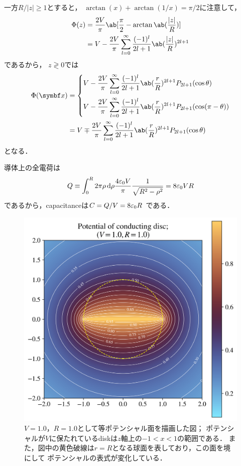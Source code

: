   一方$R / |z| \geq 1$とすると，
  $\arctan(x) + \arctan(1/x) = \pi/2$に注意して，
  \begin{align}%
    \Phi(z) &= \frac{2V}{\pi}\ab[\frac{\pi}{2}-\arctan\ab(\frac{|z|}{R})]\notag\\
    &= V - \frac{2V}{\pi} \sum_{l=0}^\infty \frac{(-1)^l}{2l+1}\ab(\frac{|z|}{R})^{2l+1}
  \end{align}%
  であるから，
  $z \gtrless 0$では
  \begin{align}%
    \Phi(\bs{x}) &=
    \begin{dcases}
      V - \frac{2V}{\pi} \sum_{l=0}^\infty \frac{(-1)^l}{2l+1} \ab(\frac rR)^{2l+1} P_{2l+1}(\cos\theta)\\
      V - \frac{2V}{\pi} \sum_{l=0}^\infty \frac{(-1)^l}{2l+1} \ab(\frac rR)^{2l+1} P_{2l+1}(\cos(\pi-\theta))
    \end{dcases}\notag\\
    &= V \mp \frac{2V}{\pi}
    \sum_{l=0}^\infty \frac{(-1)^l}{2l+1} \ab(\frac rR)^{2l+1} P_{2l+1}(\cos\theta)
  \end{align}
  となる．

  導体上の全電荷は
  \begin{gather}%
    Q \equiv \int_0^R 2\pi \rho \dl{\rho} 
    \frac{4\eps_0 V}{\pi} \frac{1}{\sqrt{R^2  -\rho^2}} = 8\eps_0 VR
  \end{gather}%
  であるから，capacitanceは$C = Q/V = 8\varepsilon_0 R$
  である．
  \begin{figure}[H]%
    \centering%
    \includegraphics[width=0.8\linewidth]{py/3-3_normal_w_circle.png}%
    \caption{$V=1.0$，$R = 1.0$として等ポテンシャル面を描画した図；
    ポテンシャルが$V$に保たれているdiskは$z$軸上の$-1 < x <1$の範囲である．
    また，図中の黄色破線は$r = R$となる球面を表しており，この面を境にして
    ポテンシャルの表式が変化している．}%
    \label{fig:3-3_normal_w_circle}%
  \end{figure}%


